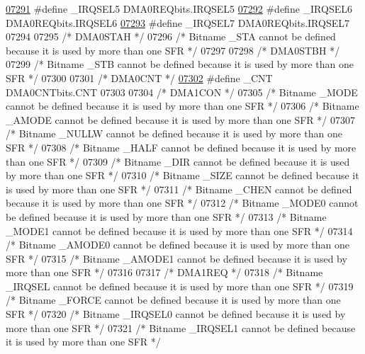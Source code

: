 \begin{DoxyCode}
\hypertarget{a00009_source_l07291}{}\hyperlink{a00009_a8c944748720e61cfd5e7398fb71ff632}{07291} \textcolor{preprocessor}{#define \_IRQSEL5 DMA0REQbits.IRQSEL5}
\hypertarget{a00009_source_l07292}{}\hyperlink{a00009_a97558d374c6fd8241a2b51ad466d851e}{07292} \textcolor{preprocessor}{#define \_IRQSEL6 DMA0REQbits.IRQSEL6}
\hypertarget{a00009_source_l07293}{}\hyperlink{a00009_a5848cebe8fe613ebc3105f2fc4691dee}{07293} \textcolor{preprocessor}{#define \_IRQSEL7 DMA0REQbits.IRQSEL7}
07294 
07295 \textcolor{comment}{/* DMA0STAH */}
07296 \textcolor{comment}{/* Bitname \_STA cannot be defined because it is used by more than one SFR */}
07297 
07298 \textcolor{comment}{/* DMA0STBH */}
07299 \textcolor{comment}{/* Bitname \_STB cannot be defined because it is used by more than one SFR */}
07300 
07301 \textcolor{comment}{/* DMA0CNT */}
\hypertarget{a00009_source_l07302}{}\hyperlink{a00009_a562136de9a0d6048a03513698ff49cfc}{07302} \textcolor{preprocessor}{#define \_CNT DMA0CNTbits.CNT}
07303 
07304 \textcolor{comment}{/* DMA1CON */}
07305 \textcolor{comment}{/* Bitname \_MODE cannot be defined because it is used by more than one SFR */}
07306 \textcolor{comment}{/* Bitname \_AMODE cannot be defined because it is used by more than one SFR */}
07307 \textcolor{comment}{/* Bitname \_NULLW cannot be defined because it is used by more than one SFR */}
07308 \textcolor{comment}{/* Bitname \_HALF cannot be defined because it is used by more than one SFR */}
07309 \textcolor{comment}{/* Bitname \_DIR cannot be defined because it is used by more than one SFR */}
07310 \textcolor{comment}{/* Bitname \_SIZE cannot be defined because it is used by more than one SFR */}
07311 \textcolor{comment}{/* Bitname \_CHEN cannot be defined because it is used by more than one SFR */}
07312 \textcolor{comment}{/* Bitname \_MODE0 cannot be defined because it is used by more than one SFR */}
07313 \textcolor{comment}{/* Bitname \_MODE1 cannot be defined because it is used by more than one SFR */}
07314 \textcolor{comment}{/* Bitname \_AMODE0 cannot be defined because it is used by more than one SFR */}
07315 \textcolor{comment}{/* Bitname \_AMODE1 cannot be defined because it is used by more than one SFR */}
07316 
07317 \textcolor{comment}{/* DMA1REQ */}
07318 \textcolor{comment}{/* Bitname \_IRQSEL cannot be defined because it is used by more than one SFR */}
07319 \textcolor{comment}{/* Bitname \_FORCE cannot be defined because it is used by more than one SFR */}
07320 \textcolor{comment}{/* Bitname \_IRQSEL0 cannot be defined because it is used by more than one SFR */}
07321 \textcolor{comment}{/* Bitname \_IRQSEL1 cannot be defined because it is used by more than one SFR */}

\end{DoxyCode}
